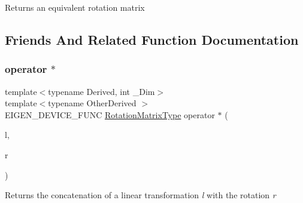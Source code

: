 \begin{DoxyReturn}{Returns}
an equivalent rotation matrix 
\end{DoxyReturn}


\subsection{Friends And Related Function Documentation}
\mbox{\label{class_eigen_1_1_rotation_base_aa9a541f4a0b00b5463478c4973f7f112}} 
\subsubsection{\texorpdfstring{operator $\ast$}{operator *}\hspace{0.1cm}{\footnotesize\ttfamily [1/2]}}
{\footnotesize\ttfamily template$<$typename Derived, int \+\_\+\+Dim$>$ \\
template$<$typename Other\+Derived $>$ \\
E\+I\+G\+E\+N\+\_\+\+D\+E\+V\+I\+C\+E\+\_\+\+F\+U\+NC \mbox{\hyperlink{class_eigen_1_1_rotation_base_a83602509674c9d635551998460342951}{Rotation\+Matrix\+Type}} operator $\ast$ (\begin{DoxyParamCaption}\item[{const \mbox{\hyperlink{struct_eigen_1_1_eigen_base}{Eigen\+Base}}$<$ Other\+Derived $>$ \&}]{l,  }\item[{const Derived \&}]{r }\end{DoxyParamCaption})\hspace{0.3cm}{\ttfamily [friend]}}

\begin{DoxyReturn}{Returns}
the concatenation of a linear transformation {\itshape l} with the rotation {\itshape r} 
\end{DoxyReturn}
\mbox{\label{class_eigen_1_1_rotation_base_a82017b7513e822b9adb8161abd1a9bbe}} 
